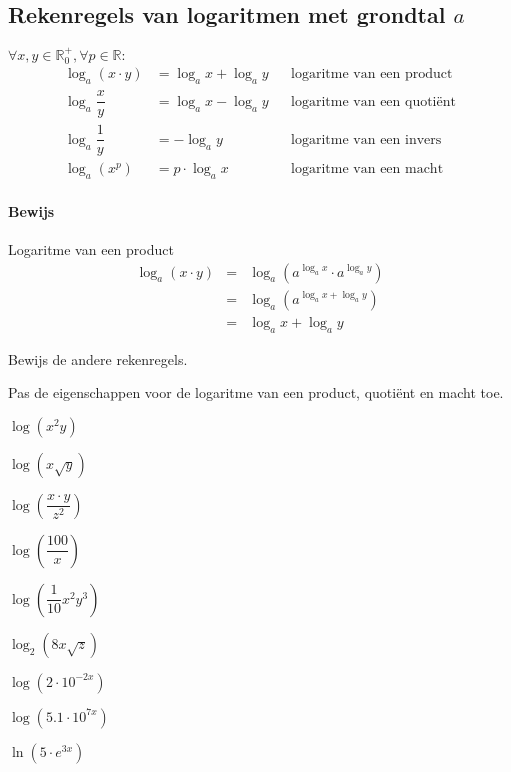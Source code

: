 \documentclass[12pt,twoside]{article}
\begin{document}
\subsection{Rekenregels van logaritmen met grondtal $a$}

\begin{mdframed}
$\forall x,y \in \mathbb{R}_0^+, \forall p\in \mathbb{R}:$
\begin{align*}
\log_a(x\cdot y) &= \log_a x + \log_a y && \mbox{logaritme van een product}\\
\log_a \dfrac{x}{y} &= \log_a x - \log_a y && \mbox{logaritme van een quotiënt}\\
\log_a \dfrac{1}{y} &= - \log_a y && \mbox{logaritme van een invers}\\
\log_a(x^p) &= p\cdot\log_a x && \mbox{logaritme van een macht}
\end{align*}
\end{mdframed}

\paragraph{Bewijs} Logaritme van een product
\begin{eqnarray*}
  \log_a(x\cdot y) &=& \log_a\left(a^{\log_a x}\cdot a^{\log_a y}\right)\\
                   &=& \log_a\left(a^{\log_a x + \log_a y}\right)\\
                   &=& \log_a x + \log_a y
\end{eqnarray*}

\begin{oefening}
Bewijs de andere rekenregels.
\end{oefening}

\begin{oefening} %
Pas de eigenschappen voor de logaritme van een product, quotiënt en macht toe.
\begin{exlist}{3}
  \item $\log \left(x^2y\right)$
  \item $\log \left(x\sqrt{y}\right)$
  \item $\log \left(\dfrac{x\cdot y}{z^2}\right)$
  \item $\log \left(\dfrac{100}{x}\right)$
  \item $\log \left(\dfrac{1}{10}x^2y^3\right)$
  \item $\log_2 \left(8x\sqrt{z}\right)$
  \item $\log \left(2\cdot 10^{-2x}\right)$
  \item $\log \left(5.1\cdot 10^{7x}\right)$
  \item $\ln \left(5\cdot e^{3x}\right)$
\end{exlist}
\end{oefening}
\end{document}
